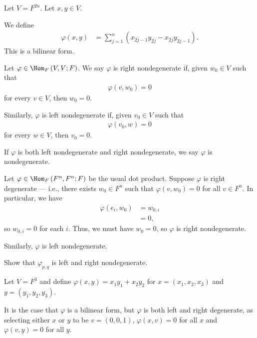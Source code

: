 \documentclass[10pt]{mypackage}
\begin{document}
  \begin{example}
    Let $V = F^{2n}$. Let $x,y\in V$.\newline

    We define
    \begin{align*}
      \varphi\left(x,y\right) &= \sum_{j=1}^{n}\left(x_{2j-1}y_{2j} - x_{2j}y_{2j-1}\right).
    \end{align*}
    This is a bilinear form.
  \end{example}
  \begin{definition}
    Let $\varphi\in \Hom_{F}\left(V,V;F\right)$. We say $\varphi$ is right nondegenerate if, given $w_0\in V$ such that
    \begin{align*}
      \varphi\left(v,w_0\right) = 0
    \end{align*}
    for every $v\in V$, then $w_0 = 0$.\newline

    Similarly, $\varphi$ is left nondegenerate if, given $v_0\in V$ such that
    \begin{align*}
      \varphi\left(v_0,w\right) = 0
    \end{align*}
    for every $w\in V$, then $v_0 = 0$.\newline

    If $\varphi$ is both left nondegenerate and right nondegenerate, we say $\varphi$ is nondegenerate.
  \end{definition}
  \begin{example}
    Let $\varphi\in \Hom_{F}\left(F^n,F^n;F\right)$ be the usual dot product. Suppose $\varphi$ is right degenerate --- i.e., there exists $w_0\in F^n$ such that $\varphi\left(v,w_0\right) = 0$ for all $v\in F^n$. In particular, we have 
    \begin{align*}
      \varphi\left(e_i,w_0\right) &= w_{0,i}\\
                                  &= 0,
    \end{align*}
    so $w_{0,i} = 0$ for each $i$. Thus, we must have $w_0 = 0$, so $\varphi$ is right nondegenerate.\newline

    Similarly, $\varphi$ is left nondegenerate.
  \end{example}
  \begin{exercise}
    Show that $\varphi_{p,q}$ is left and right nondegenerate.
  \end{exercise}
  \begin{example}
    Let $V = F^{3}$ and define $\varphi\left(x,y\right) = x_1y_1 + x_2y_2$ for $x = \left(x_1,x_2,x_3\right)$ and $y = \left(y_1,y_2,y_3\right)$.\newline

    It is the case that $\varphi$ is a bilinear form, but $\varphi$ is both left and right degenerate, as selecting either $x$ or $y$ to be $ v = \left(0,0,1\right)$, $\varphi\left(x,v\right) = 0$ for all $x$ and $\varphi\left(v,y\right) = 0$ for all $y$.
  \end{example}
\end{document}
